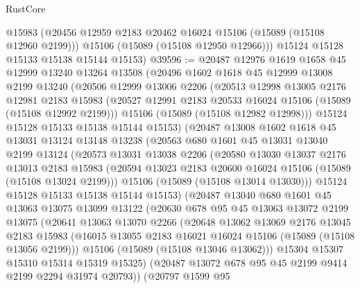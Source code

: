 \begin{lexlean}{RustCore}
\begin{coremodule}
        @15983
        (@20456 @12959 @2183 @20462 @16024 @15106 (@15089 (@15108 @12960 @2199)))
        @15106
        (@15089 (@15108 @12950 @12966)))
      @15124
      @15128
      @15133
      @15138
      @15144
      @15153)
@39596 := @20487
    @12976
    @1619
    @1658
    @45
    @12999
    @13240
    @13264
    @13508
    (@20496
      @1602
      @1618
      @45
      @12999
      @13008
      @2199
      @13240
      (@20506
        @12999
        @13006
        @2206
        (@20513
          @12998
          @13005
          @2176
          @12981
          @2183
          @15983
          (@20527 @12991 @2183 @20533 @16024 @15106 (@15089 (@15108 @12992 @2199)))
          @15106
          (@15089 (@15108 @12982 @12998)))
        @15124
        @15128
        @15133
        @15138
        @15144
        @15153)
      (@20487
        @13008
        @1602
        @1618
        @45
        @13031
        @13124
        @13148
        @13238
        (@20563
          @680
          @1601
          @45
          @13031
          @13040
          @2199
          @13124
          (@20573
            @13031
            @13038
            @2206
            (@20580
              @13030
              @13037
              @2176
              @13013
              @2183
              @15983
              (@20594 @13023 @2183 @20600 @16024 @15106 (@15089 (@15108 @13024 @2199)))
              @15106
              (@15089 (@15108 @13014 @13030)))
            @15124
            @15128
            @15133
            @15138
            @15144
            @15153)
          (@20487
            @13040
            @680
            @1601
            @45
            @13063
            @13075
            @13099
            @13122
            (@20630
              @678
              @95
              @45
              @13063
              @13072
              @2199
              @13075
              (@20641
                @13063
                @13070
                @2266
                (@20648
                  @13062
                  @13069
                  @2176
                  @13045
                  @2183
                  @15983
                  (@16015 @13055 @2183 @16021 @16024 @15106 (@15089 (@15108 @13056 @2199)))
                  @15106
                  (@15089 (@15108 @13046 @13062)))
                @15304
                @15307
                @15310
                @15314
                @15319
                @15325)
              (@20487 @13072 @678 @95 @45 @2199 @9414 @2199 @2294 @31974 @20793))
            (@20797
              @1599
              @95

\end{coremodule}
\end{lexlean}
